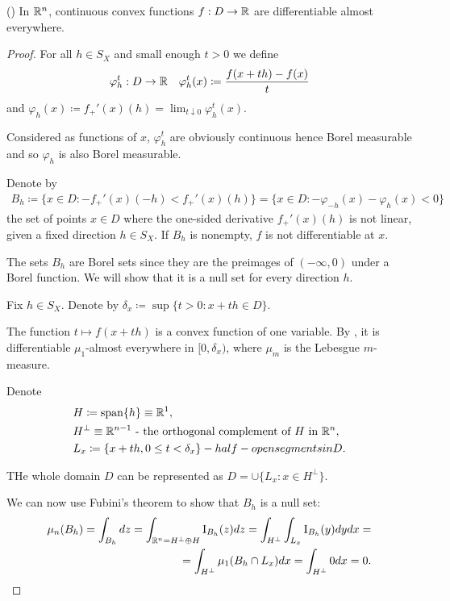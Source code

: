 \begin{theorem}\label{thm:rn_continuous_convex_frechet_almost_everywhere}(\cite[exercise 1.17]{Phelps1993})
  In $\mathbb R^n$, continuous convex functions $f: D \to \mathbb R$ are differentiable almost everywhere.
\end{theorem}
\begin{proof}
  For all $h \in S_X$ and small enough $t > 0$ we define
  \begin{align*}
    &\varphi_h^t: D \to \mathbb R
    &\varphi_h^t(x) \coloneqq \frac {f(x + th) - f(x)} t
  \end{align*}
  and $\varphi_h(x) \coloneqq f_+'(x)(h) = \lim_{t \downarrow 0} \varphi_h^t(x)$.

  Considered as functions of $x$, $\varphi_h^t$ are obviously continuous hence Borel measurable and so $\varphi_h$ is also Borel measurable.

  Denote by
  \begin{align*}
    B_h
    \coloneqq
    \{ x \in D \colon -f_+'(x)(-h) < f_+'(x)(h) \}
    =
    \{ x \in D \colon -\varphi_{-h}(x) - \varphi_h(x) < 0 \}
  \end{align*}
  the set of points $x \in D$ where the one-sided derivative $f_+'(x)(h)$ is not linear, given a fixed direction $h \in S_X$. If $B_h$ is nonempty, $f$ is not differentiable at $x$.

  The sets $B_h$ are Borel sets since they are the preimages of $(-\infty, 0)$ under a Borel function. We will show that it is a null set for every direction $h$.

  Fix $h \in S_X$. Denote by $\delta_x \coloneqq \sup \{ t > 0 \colon x + th \in D \}$.

  The function $t \mapsto f(x + th)$ is a convex function of one variable. By \cite[theorem 1.16]{Phelps1993}, it is differentiable $\mu_1$-almost everywhere in $[0, \delta_x)$, where $\mu_m$ is the Lebesgue $m$-measure.

  Denote
  \begin{align*}
    &H \coloneqq \operatorname{span}\{ h \} \equiv \mathbb R^1,
    \\
    &H^\perp \equiv \mathbb R^{n-1} \text{ - the orthogonal complement of $H$ in $\mathbb R^n$},
    \\
    &L_x \coloneqq \{ x + th, 0 \leq t < \delta_x \} - half-open segments in D.
  \end{align*}

  THe whole domain $D$ can be represented as $D = \cup \{ L_x \colon x \in H^\perp \}$.

  We can now use Fubini's theorem to show that $B_h$ is a null set:
  \begin{align*}
    \mu_n(B_h)
    =
    \int_{B_h} dz
    =
    \int_{\mathbb R^n = H^\perp \oplus H} \operatorname{I}_{B_h} (z) dz
    =
    \int_{H^\perp} \int_{L_x} \operatorname{I}_{B_h} (y) dy dx
    = \\ =
    \int_{H^\perp} \mu_1(B_h \cap L_x) dx
    =
    \int_{H^\perp} 0 dx
    =
    0.
  \end{align*}


\end{proof}

